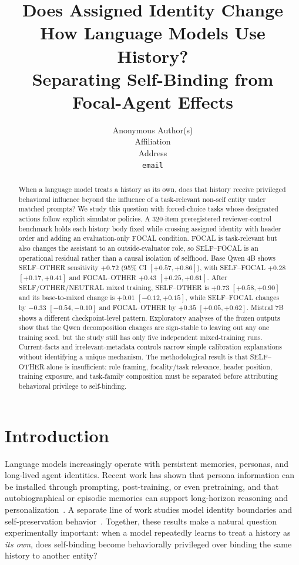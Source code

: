\documentclass{article}
\title{Does Assigned Identity Change How Language Models Use History?\\Separating Self-Binding from\\Focal-Agent Effects}
\author{Anonymous Author(s) \\
Affiliation \\
Address \\
\texttt{email} \\
}
\begin{document}
\maketitle

\begin{abstract}
When a language model treats a history as its own, does that history receive privileged behavioral influence beyond the influence of a task-relevant non-self entity under matched prompts? We study this question with forced-choice tasks whose designated actions follow explicit simulator policies. A 320-item preregistered reviewer-control benchmark holds each history body fixed while crossing assigned identity with header order and adding an evaluation-only FOCAL condition. FOCAL is task-relevant but also changes the assistant to an outside-evaluator role, so SELF--FOCAL is an operational residual rather than a causal isolation of selfhood. Base Qwen 4B shows SELF--OTHER sensitivity $+0.72$ (95\% CI $[+0.57,+0.86]$), with SELF--FOCAL $+0.28$ $[+0.17,+0.41]$ and FOCAL--OTHER $+0.43$ $[+0.25,+0.61]$. After SELF/OTHER/NEUTRAL mixed training, SELF--OTHER is $+0.73$ $[+0.58,+0.90]$ and its base-to-mixed change is $+0.01$ $[-0.12,+0.15]$, while SELF--FOCAL changes by $-0.33$ $[-0.54,-0.10]$ and FOCAL--OTHER by $+0.35$ $[+0.05,+0.62]$. Mistral 7B shows a different checkpoint-level pattern. Exploratory analyses of the frozen outputs show that the Qwen decomposition changes are sign-stable to leaving out any one training seed, but the study still has only five independent mixed-training runs. Current-facts and irrelevant-metadata controls narrow simple calibration explanations without identifying a unique mechanism. The methodological result is that SELF--OTHER alone is insufficient: role framing, focality/task relevance, header position, training exposure, and task-family composition must be separated before attributing behavioral privilege to self-binding.
\end{abstract}

\section{Introduction}

Language models increasingly operate with persistent memories, personas, and long-lived agent identities. Recent work has shown that persona information can be installed through prompting, post-training, or even pretraining, and that autobiographical or episodic memories can support long-horizon reasoning and personalization~\citep{minder2026spp,araujo2026persistent,peng2026heart,wu2026knowme,pan2026episodic}. A separate line of work studies model identity boundaries and self-preservation behavior~\citep{douglas2026artificialself,lu2026survive}. Together, these results make a natural question experimentally important: when a model repeatedly learns to treat a history as \emph{its own}, does self-binding become behaviorally privileged over binding the same history to another entity?
\end{document}

